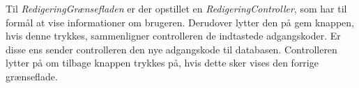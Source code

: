 \noindent






Til \textit{RedigeringGrænsefladen} er der opstillet en \textit{RedigeringController}, som har til formål at vise informationer om brugeren. Derudover lytter den på gem knappen, hvis denne trykkes, sammenligner controlleren de indtastede adgangskoder. Er disse ens sender controlleren den  nye adgangskode til databasen. Controlleren lytter på om tilbage knappen trykkes på, hvis dette sker vises den forrige grænseflade.  

